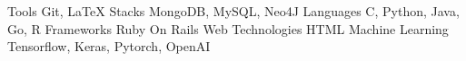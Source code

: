 



  \begin{cvskills}
  \cvskill
    {Tools}
    {Git, LaTeX} 
  \cvskill
    {Stacks}
    {MongoDB, MySQL, Neo4J}
  \cvskill
    {Languages}
    {C, Python, Java, Go, R}
  \cvskill
    {Frameworks}
    {Ruby On Rails}
  \cvskill
    {Web Technologies}
    {HTML}
  \cvskill
    {Machine Learning}
    {Tensorflow, Keras, Pytorch, OpenAI}
    

  \end{cvskills}


